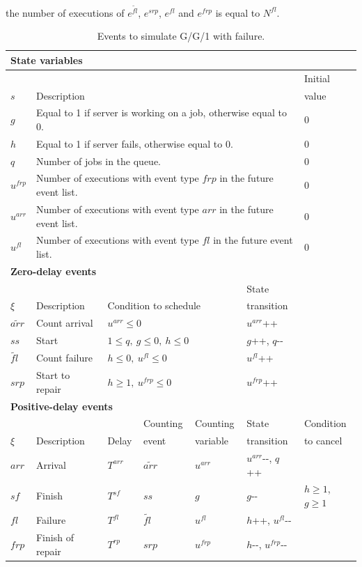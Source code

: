 \documentclass[]{interact}
\theoremstyle{plain}%
\theoremstyle{definition}
\theoremstyle{remark}
\begin{document}
the number of executions of $e^{\tilde{fl}}$, $e^{srp}$, $e^{fl}$ and $e^{frp}$ is equal to $N^{fl}$.

\begin{table}[h]
	\begin{tabular}{lllllll} 
		\multicolumn{7}{l}{\textbf{State variables}}\\ \hline
				 &&&&&& Initial\\
		$s$ & \multicolumn{5}{l}{Description}& value\\\hline
		$g$&\multicolumn{5}{l}{Equal to 1 if server is working on a job, otherwise equal to 0.}&0\\
		$h$&\multicolumn{5}{l}{Equal to 1 if server fails, otherwise equal to 0.}&0\\
		$q$&\multicolumn{5}{l}{Number of jobs in the queue.}&0\\
		$u^{frp}$&\multicolumn{5}{l}{Number of executions with event type $frp$ in the future event list.}&0\\
		$u^{arr}$&\multicolumn{5}{l}{Number of executions with event type $arr$ in the future event list.}&0\\
		$u^{fl}$&\multicolumn{5}{l}{Number of executions with event type $fl$ in the future event list.}&0\\
		\multicolumn{7}{l}{\textbf{Zero-delay events}}\\ \hline
				 &&&&& State&\\
		$\xi$&Description &  \multicolumn{3}{l}{Condition to schedule}& transition&\\\hline
		${\tilde{arr}}$ & Count arrival &  \multicolumn{3}{l}{$u^{arr}\le 0$} & $u^{arr}${\footnotesize++}& \\
		${ss}$&Start&  \multicolumn{3}{l}{$1\le q,\ g\le 0,\ h\le 0$} &$g${\footnotesize++}, $q${\small-}{\small-}&  \\
		${\tilde{fl}}$& Count failure &  \multicolumn{3}{l}{$h\le 0,\ u^{fl}\le 0$} & $u^{fl}${\footnotesize++}& \\
		${srp}$&Start to repair&\multicolumn{3}{l}{$h\ge 1,\ u^{frp}\le 0$}&  $u^{frp}${\footnotesize++}&  \\
		\multicolumn{7}{l}{\textbf{Positive-delay events}}\\ \hline
				&&& Counting& Counting  & State& Condition\\
		$\xi$&Description & Delay &  event& variable & transition&to cancel\\\hline
		${arr}$&Arrival & $T^{arr}$& ${\tilde{arr}}$&  $u^{arr}$&  $u^{arr}${\small-}{\small-},  $q${\footnotesize++}&\\	
		${sf}$&Finish & $T^{sf}$& ${ss}$&  $g$&  $g${\small-}{\small-}&$h\ge 1$, $g\ge 1$\\	
		${fl}$&Failure & $T^{fl}$& ${\tilde{fl}}$&  $u^{fl}$&   $h${\footnotesize++}, $u^{fl}${\small-}{\small-}&\\	
		${frp}$&Finish of repair & $T^{rp}$& ${srp}$&  $u^{frp}$&   $h${\small-}{\small-}, $u^{frp}${\small-}{\small-}&\\	\hline
	\end{tabular}
	\caption{Events to simulate G/G/1 with failure.}
	\label{tab:failure}
\end{table}
\end{document}
